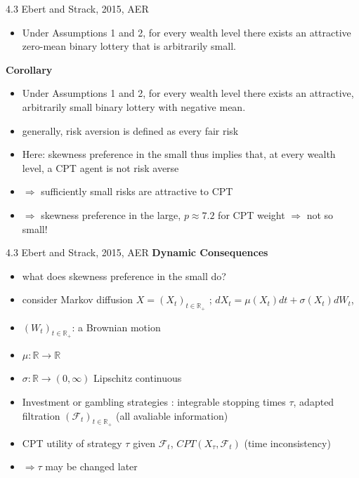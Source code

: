 \documentclass[11pt, aspectratio=169]{beamer}
\begin{document}
\begin{frame}{4.3 Ebert and Strack, 2015, AER}

    \begin{itemize}
        \item Under Assumptions 1 and 2, for every wealth level there exists an attractive zero-mean binary lottery that is arbitrarily small. \medskip
	\end{itemize}

    \textbf{Corollary}\\
    \begin{itemize}
        \item  Under Assumptions 1 and 2, for every wealth level there exists an attractive, arbitrarily small binary lottery with negative mean.\medskip
	\end{itemize}
    \begin{itemize}
        \item generally, risk aversion is defined as every fair risk\medskip
        \item Here: skewness preference in the small thus implies that, at every wealth level, a CPT agent is not risk averse\medskip
        \item $\Rightarrow $  sufficiently small risks are attractive to CPT\medskip
        \item \citet{AzevedoGottlieb2012} $\Rightarrow$ skewness preference in the large, $p\approx 7.2$ for CPT weight $\Rightarrow$ not so small!\medskip
	\end{itemize}
\end{frame}

\begin{frame}{4.3 Ebert and Strack, 2015, AER}
    \textbf{Dynamic Consequences}\\
    \begin{itemize}
        \item what does skewness preference in the small do?\medskip
        \item consider  Markov diffusion $ X= (X_t)_{t \in \mathbb{R}_+ }$ ; $dX_t = \mu(X_t)dt + \sigma (X_t)dW_t $,\medskip
        \item $(W_t)_{t \in \mathbb{R}_+ }$: a Brownian motion\medskip
        \item $\mu:\mathbb{R} \rightarrow \mathbb{R} $ \medskip
        \item $\sigma : \mathbb{R}  \rightarrow (0,\infty) $ Lipschitz continuous\medskip
        \item Investment or gambling strategies : integrable stopping times $\tau $, adapted filtration $(\mathcal{F} _t)_{t \in \mathbb{R}_+ } $ (all avaliable information)\medskip
        \item CPT utility of strategy $\tau$ given $\mathcal{F} _t$, $CPT(X_\tau,\mathcal{F}_t)$ (time inconsistency)\medskip
        \item $\Rightarrow \tau$ may be changed later\medskip
       	\end{itemize}
\end{frame}
\end{document}
